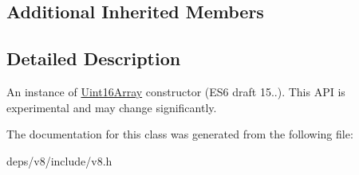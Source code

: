 \subsection*{Additional Inherited Members}


\subsection{Detailed Description}
An instance of \hyperlink{classv8_1_1_uint16_array}{Uint16\+Array} constructor (E\+S6 draft 15..). This A\+P\+I is experimental and may change significantly. 

The documentation for this class was generated from the following file\+:\begin{DoxyCompactItemize}
\item 
deps/v8/include/v8.\+h\end{DoxyCompactItemize}
